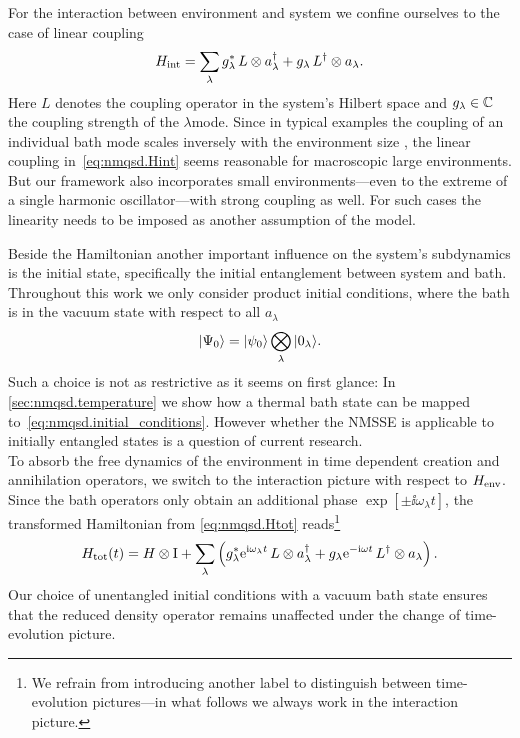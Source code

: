 For the interaction between environment and system we confine ourselves to the case of linear coupling
\begin{equation}
  H_\mathrm{int} = \sum_\lambda {g}^*_\lambda \, L \otimes a^\dagger_\lambda + g_\lambda \, L^\dagger \otimes a_\lambda.
  \label{eq:nmqsd.Hint}
\end{equation}
Here $L$ denotes the coupling operator in the system's Hilbert space and $g_\lambda \in \mathbb{C}$ the coupling strength of the $\lambda$\th mode.
Since in typical examples the coupling of an individual bath mode scales inversely with the environment size \cite{We99_dissipative_systems}, the linear coupling in~\ref{eq:nmqsd.Hint} seems reasonable for macroscopic large environments.
But our framework also incorporates small environments---even to the extreme of a single harmonic oscillator---with strong coupling as well.
For such cases the linearity needs to be imposed as another assumption of the model.

Beside the Hamiltonian another important influence on the system's subdynamics is the initial state, specifically the initial entanglement between system and bath.
Throughout this work we only consider product initial conditions, where the bath is in the vacuum state with respect to all $a_\lambda$
\begin{equation}
  | \Psi_0 \rangle = | \psi_0 \rangle \bigotimes\limits_\lambda | 0_\lambda \rangle.
  \label{eq:nmqsd.initial_conditions}
\end{equation}
Such a choice is not as restrictive as it seems on first glance: In \autoref{sec:nmqsd.temperature} we show how a thermal bath state can be mapped to~\ref{eq:nmqsd.initial_conditions}.
However whether the NMSSE is applicable to initially entangled states is a question of current research.\\



To absorb the free dynamics of the environment in time dependent creation and annihilation operators, we switch to the interaction picture with respect to $H_\mathrm{env}$.
Since the bath operators only obtain an additional phase $\exp[\pm \ii \omega_\lambda t]$, the transformed Hamiltonian from \autoref{eq:nmqsd.Htot} reads\footnote{%
  We refrain from introducing another label to distinguish between time-evolution pictures---in what follows we always work in the interaction picture.
}
\begin{equation}
  \Htot(t) = \Hsys \otimes \unit  +  \sum_\lambda \left( \cc{g}_\lambda \exp[\ii \omega_\lambda t] \, L \otimes \adj{a}_\lambda + g_\lambda \exp[-\ii \omega t] \, \adj{L} \otimes a_\lambda \right).
  \label{eq:nmqsd.Htot}
\end{equation}
Our choice of unentangled initial conditions with a vacuum bath state ensures that the reduced density operator remains unaffected under the change of time-evolution picture.

